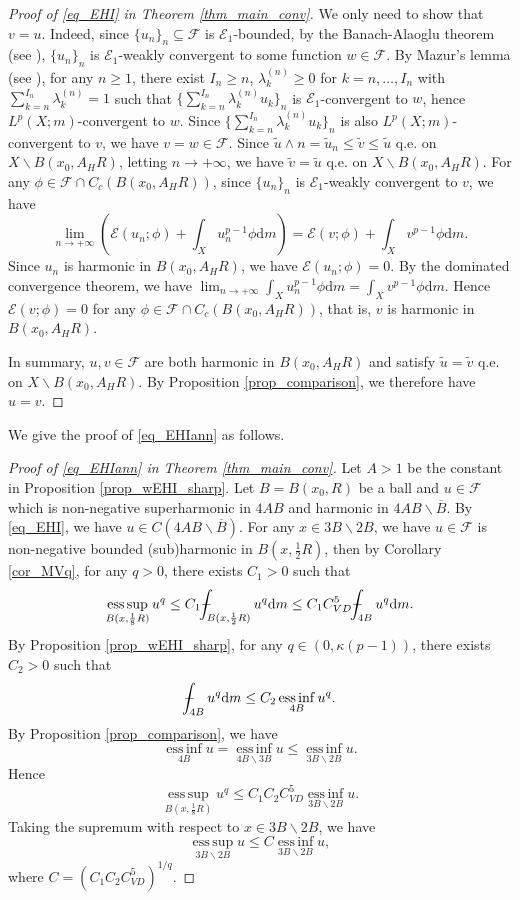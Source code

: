 \documentclass[11pt,a4paper]{article}
\numberwithin{equation}{section}
\newcommand{\esup}{\operatorname*{ess\,sup}}
\newcommand{\einf}{\operatorname*{ess\,inf}}
\def\Xint#1{\mathchoice
{\XXint\displaystyle\textstyle{#1}}%
{\XXint\textstyle\scriptstyle{#1}}%
{\XXint\scriptstyle\scriptscriptstyle{#1}}%
{\XXint\scriptscriptstyle\scriptscriptstyle{#1}}%
\!\int}
\def\XXint#1#2#3{{\setbox0=\hbox{$#1{#2#3}{\int}$ }
\vcenter{\hbox{$#2#3$ }}\kern-.6\wd0}}
\def\dashint{\Xint-}
\theoremstyle{plain}
\theoremstyle{definition}
\begin{document}
\begin{proof}[Proof of \ref{eq_EHI} in Theorem \ref{thm_main_conv}]
We only need to show that $v=u$. Indeed, since $\{u_n\}_n\subseteq \mathcal{F}$ is $\mathcal{E}_1$-bounded, by the Banach-Alaoglu theorem (see \cite[Theorem 3 in Chapter12]{Lax02}), $\{u_n\}_n$ is $\mathcal{E}_1$-weakly convergent to some function $w\in \mathcal{F}$. By Mazur's lemma (see \cite[Theorem 2 in Section V.1]{Yos95}), for any $n\ge1$, there exist $I_n\ge n$, $\lambda^{(n)}_k\ge0$ for $k=n,\ldots,I_n$ with $\sum_{k=n}^{I_n}\lambda^{(n)}_k=1$ such that $\{\sum_{k=n}^{I_n}\lambda^{(n)}_ku_k\}_n$ is $\mathcal{E}_1$-convergent to $w$, hence $L^p(X;m)$-convergent to $w$. Since $\{\sum_{k=n}^{I_n}\lambda^{(n)}_ku_k\}_n$ is also $L^p(X;m)$-convergent to $v$, we have $v=w\in \mathcal{F}$. Since $\widetilde{u}\wedge n=\widetilde{u}_n\le \widetilde{v}\le \widetilde{u}$ q.e. on $X\backslash B(x_0,A_HR)$, letting $n\to+\infty$, we have $\widetilde{v}=\widetilde{u}$ q.e. on $X\backslash B(x_0,A_HR)$. For any $\phi\in \mathcal{F}\cap C_c(B(x_0,A_HR))$, since $\{u_n\}_n$ is $\mathcal{E}_1$-weakly convergent to $v$, we have
$$\lim_{n\to+\infty}\left(\mathcal{E}(u_n;\phi)+\int_Xu_n^{p-1}\phi \mathrm{d}m\right)=\mathcal{E}(v;\phi)+\int_Xv^{p-1}\phi \mathrm{d}m.$$
Since $u_n$ is harmonic in $B(x_0,A_HR)$, we have $\mathcal{E}(u_n;\phi)=0$. By the dominated convergence theorem, we have $\lim_{n\to+\infty}\int_Xu_n^{p-1}\phi \mathrm{d}m=\int_Xv^{p-1}\phi \mathrm{d}m$. Hence $\mathcal{E}(v;\phi)=0$ for any $\phi\in \mathcal{F}\cap C_c(B(x_0,A_HR))$, that is, $v$ is harmonic in $B(x_0,A_HR)$.

In summary, $u,v\in \mathcal{F}$ are both harmonic in $B(x_0,A_HR)$ and satisfy $\widetilde{u}=\widetilde{v}$ q.e. on $X\backslash B(x_0,A_HR)$. By Proposition \ref{prop_comparison}, we therefore have $u=v$.
\end{proof}

We give the proof of \ref{eq_EHIann} as follows.

\begin{proof}[Proof of \ref{eq_EHIann} in Theorem \ref{thm_main_conv}]
Let $A>1$ be the constant in Proposition \ref{prop_wEHI_sharp}. Let $B=B(x_0,R)$ be a ball and $u\in \mathcal{F}$ which is non-negative superharmonic in $4AB$ and harmonic in $4AB\backslash \overline{B}$. By \ref{eq_EHI}, we have $u\in C(4AB\backslash \overline{B})$. For any $x\in 3B\backslash 2B$, we have $u\in \mathcal{F}$ is non-negative bounded (sub)harmonic in $B(x,\frac{1}{2}R)$, then by Corollary \ref{cor_MVq}, for any $q>0$, there exists $C_1>0$ such that
$$\esup_{B(x,\frac{1}{8}R)}u^q\le C_1\dashint_{B(x,\frac{1}{2}R)}u^q \mathrm{d}m\le C_1C_{VD}^5\dashint_{4B}u^q \mathrm{d}m.$$
By Proposition \ref{prop_wEHI_sharp}, for any $q\in(0,\kappa(p-1))$, there exists $C_2>0$ such that
$$\dashint_{4B}u^q \mathrm{d}m\le C_2\einf_{4B}u^q.$$
By Proposition \ref{prop_comparison}, we have
$$\einf_{4B}u=\einf_{4B\backslash 3B}u\le\einf_{3B\backslash 2B}u.$$
Hence
$$\esup_{B(x,\frac{1}{8}R)}u^q\le C_1C_2C_{VD}^5\einf_{3B\backslash 2B}u.$$
Taking the supremum with respect to $x\in 3B\backslash 2B$, we have
$$\esup_{3B\backslash 2B}u\le C\einf_{3B\backslash 2B}u,$$
where $C=(C_1C_2C_{VD}^5)^{1/q}$.
\end{proof}
\end{document}
